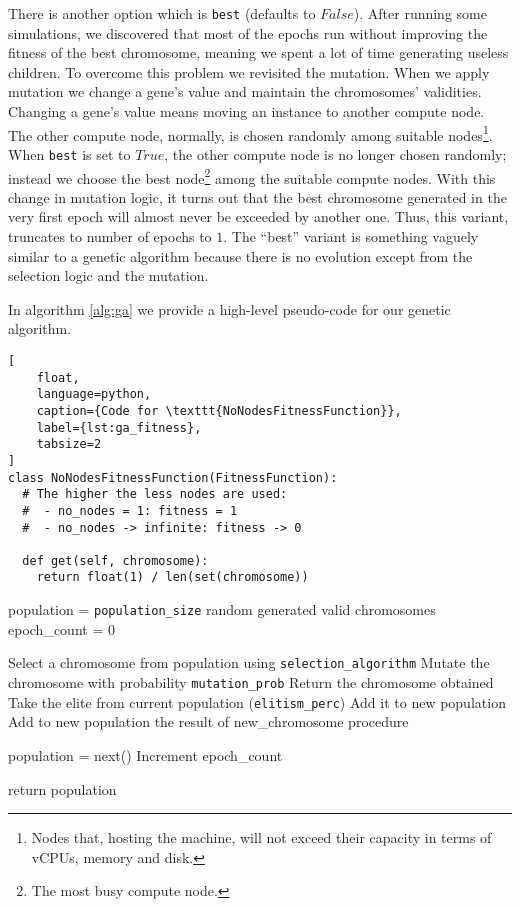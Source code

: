 There is another option which is \texttt{best} (defaults to $False$). After running some simulations, we discovered that most of the epochs run without improving the fitness of the best chromosome, meaning we spent a lot of time generating useless children. To overcome this problem we revisited the mutation. When we apply mutation we change a gene's value and maintain the chromosomes' validities. Changing a gene's value means moving an instance to another compute node. The other compute node, normally, is chosen randomly among suitable nodes\footnote{Nodes that, hosting the machine, will not exceed their capacity in terms of vCPUs, memory and disk.}. When \texttt{best} is set to $True$, the other compute node is no longer chosen randomly; instead we choose the best node\footnote{The most busy compute node.} among the suitable compute nodes. With this change in mutation logic, it turns out that the best chromosome generated in the very first epoch will almost never be exceeded by another one. Thus, this variant, truncates to number of epochs to $1$. The ``best'' variant is something vaguely similar to a genetic algorithm because there is no evolution except from the selection logic and the mutation.

In algorithm \ref{alg:ga} we provide a high-level pseudo-code for our genetic algorithm.

\begin{lstlisting}[
	float,
	language=python,
	caption={Code for \texttt{NoNodesFitnessFunction}},
	label={lst:ga_fitness},
	tabsize=2
]
class NoNodesFitnessFunction(FitnessFunction):
  # The higher the less nodes are used:
  #  - no_nodes = 1: fitness = 1
  #  - no_nodes -> infinite: fitness -> 0

  def get(self, chromosome):
    return float(1) / len(set(chromosome))
\end{lstlisting}

\begin{algorithm}[H]
\caption{Pseudo-code for our genetic algorithm}
\label{alg:ga}
\begin{algorithmic}[0]
	\State population = \texttt{population\_size} random generated valid chromosomes
	\State epoch\_count = 0
	\State

		\State Select a chromosome from population using \texttt{selection\_algorithm}
		\State Mutate the chromosome with probability \texttt{mutation\_prob}
		\State Return the chromosome obtained
	\EndProcedure
	\State
		\State Take the elite from current population (\texttt{elitism\_perc})
		\State Add it to new population
			\State Add to new population the result of new\_chromosome procedure
		\EndWhile
	\EndProcedure
	\State

		\State population = next()
		\State Increment epoch\_count
	\EndWhile

	\State
	\State return population
\end{algorithmic}
\end{algorithm}

